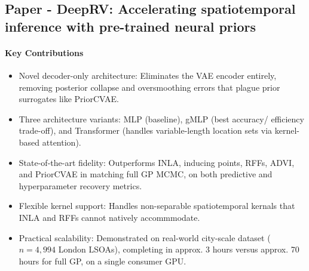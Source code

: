\documentclass[12pt,a4paper,twoside]{article}
\begin{document}
\subsection{Paper - DeepRV: Accelerating spatiotemporal inference with pre-trained neural priors}
\begin{paper}[
	papertitle={DeepRV: Accelerating spatiotemporal inference with pre-trained neural priors~\cite{Navott2025}}
	authors={Navott et al.}
	summary={DeepRV is a decoder-only neural surrogate that replaces GP prior sampling in MCMC pipelines by learning the mapping from latent noise and kernel parameters directly to function values, achieving near-exact GP accuracy at substantially reduced computational cost.}
	]

	\tcblower

	\paragraph{Key Contributions}
	\begin{itemize}
		\item Novel decoder-only architecture: Eliminates the VAE encoder entirely, removing posterior collapse and oversmoothing errors that plague prior surrogates like PriorCVAE.
		\item Three architecture variants: MLP (baseline), gMLP (best accuracy/ efficiency trade-off), and Transformer (handles variable-length location sets via kernel-based attention).
		\item State-of-the-art fidelity: Outperforms INLA, inducing points, RFFs, ADVI, and PriorCVAE in matching full GP MCMC, on both predictive and hyperparameter recovery metrics.
		\item Flexible kernel support: Handles non-separable spatiotemporal kernals that INLA and RFFs cannot natively accommmodate.
		\item Practical scalability: Demonstrated on real-world city-scale dataset ($n=4,994$ London LSOAs), completing in approx. 3 hours versus approx. 70 hours for full GP, on a single consumer GPU.
	\end{itemize}


\end{paper}
\end{document}
